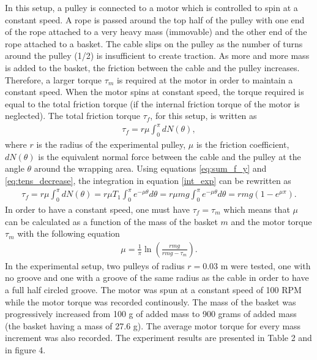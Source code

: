 \documentclass[10pt,cleanfoot]{asme2ej}
\begin{document}
In this setup, a pulley is connected to a motor which is controlled to spin at a constant speed. A rope is passed around the top half of the pulley with one end of the rope attached to a very heavy mass (immovable) and the other end of the rope attached to a basket. The cable slips on the pulley as the number of turns around the pulley (1/2) is insufficient to create traction. As more and more mass is added to the basket, the friction between the cable and the pulley increases. Therefore, a larger torque $\tau_m$ is required at the motor in order to maintain a constant speed. When the motor spins at constant speed, the torque required is equal to the total friction torque (if the internal friction torque of the motor is neglected). The total friction torque $\tau_f$, for this setup, is written as 
\begin{align}
\tau_f = r\mu\int_0^\pi dN(\theta),
\label{int_exp}
\end{align}where $r$ is the radius of the experimental pulley, $\mu$ is the friction coefficient, $dN(\theta)$ is the equivalent normal force between the cable and the pulley at the angle $\theta$ around the wrapping area. Using equations \eqref{eq:sum_f_y} and \eqref{eq:tens_decrease}, the integration in equation \eqref{int_exp} can be rewritten as 
\begin{align}
\tau_f = r\mu\int_0^\pi dN(\theta) = r\mu T_1\int_0^\pi e^{-\mu\theta}d\theta = r\mu mg\int_0^\pi e^{-\mu\theta}d\theta = rmg\left(1-e^{\mu\pi}\right).
\end{align}
In order to have a constant speed, one must have $\tau_f = \tau_m$ which means that $\mu$ can be calculated as a function of the mass of the basket $m$ and the motor torque $\tau_m$ with the following equation
\begin{align}
\mu = \frac{1}{\pi}\ln\left({\frac{rmg}{rmg-\tau_m}}\right).
\end{align} 
In the experimental setup, two pulleys of radius $r=0.03$ m were tested, one with no groove and one with a groove of the same radius as the cable in order to have a full half circled groove. The motor was spun at a constant speed of 100 RPM while the motor torque was recorded continously. The mass of the basket was progressively increased from 100 g of added mass to 900 grams of added mass (the basket having a mass of 27.6 g). The average motor torque for every mass increment was also recorded. The experiment results are presented in Table 2 and in figure 4.
\end{document}
